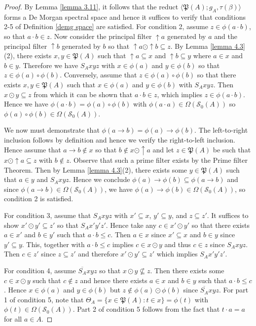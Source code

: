 \documentclass{amsart}
\theoremstyle{plain}
\theoremstyle{definition}
\begin{document}
\begin{proof}
By Lemma \ref{lemma 3.11}, it follows that the reduct $\langle\mathfrak{P}(A);g_A,\tau(\beta)\rangle$ forms a De Morgan spectral space and hence it suffices to verify that conditions 2-5 of Definition \ref{demg space} are satisfied. For condition 2, assume $z\in\phi(a\cdot b)$, so that $a\cdot b\in z$. Now consider the principal filter ${\uparrow}a$ generated by $a$ and the principal filter ${\uparrow}b$ generated by $b$ so that ${\uparrow}a\odot{\uparrow}b\subseteq z$. By Lemma \ref{lemma 4.3}(2), there exists $x,y\in\mathfrak{P}(A)$ such that ${\uparrow}a\subseteq x$ and ${\uparrow}b\subseteq y$ where $a\in x$ and $b\in y$. Therefore we have $S_Axyz$ with $x\in\phi(a)$ and $y\in\phi(b)$ so that $z\in\phi(a)\circ\phi(b)$. Conversely, assume that $z\in\phi(a)\circ\phi(b)$ so that there exists $x,y\in\mathfrak{P}(A)$ such that $x\in\phi(a)$ and $y\in\phi(b)$ with $S_Axyz$. Then $x\odot y\subseteq z$ from which it can be shown that $a\cdot b\in z$, which implies $z\in\phi(a\cdot b)$. Hence we have $\phi(a\cdot b)=\phi(a)\circ\phi(b)$ with $\phi(a\cdot a)\in\Omega(\mathcal{S}_0(A))$ so $\phi(a)\circ\phi(b)\in\Omega(\mathcal{S}_0(A))$.


We now must demonstrate that $\phi(a\rightarrow b)=\phi(a)\rightarrow\phi(b)$. The left-to-right inclusion follows by definition and hence we verify the right-to-left inclusion. Hence assume that $a\rightarrow b\not\in x$ so that $b\not\in x\odot{\uparrow}a$ and let $z\in\mathfrak{P}(A)$ be such that $x\odot{\uparrow}a\subseteq z$ with $b\not\in z$. Observe that such a prime filter exists by the Prime filter Theorem. Then by Lemma \ref{lemma 4.3}(2), there exists some $y\in\mathfrak{P}(A)$ such that $a\in y$ and $S_Axyz$. Hence we conclude $\phi(a)\rightarrow\phi(b)\subseteq\phi(a\rightarrow b)$ and since $\phi(a\rightarrow b)\in\Omega(\mathcal{S}_0(A))$, we have $\phi(a)\rightarrow\phi(b)\in\Omega(\mathcal{S}_0(A))$, so condition 2 is satisfied. 

    For condition 3, assume that $S_Axyz$ with $x'\subseteq x$, $y'\subseteq y$, and $z\subseteq z'$. It suffices to show $x'\odot y'\subseteq z'$ so that $S_Ax'y'z'$. Hence take any $c\in x'\odot y'$ so that there exists $a\in x'$ and $b\in y'$ such that $a\cdot b\leq c$. Then $a\in x$ since $x'\subseteq x$ and $b\in y$ since $y'\subseteq y$. This, together with $a\cdot b\leq c$ implies $c\in x\odot y$ and thus $c\in z$ since $S_Axyz$. Then $c\in z'$ since $z\subseteq z'$ and therefore $x'\odot y'\subseteq z'$ which implies $S_Ax'y'z'$.  

    For condition 4, assume $\overline{S_A}xyz$ so that $x\odot y\not\subseteq z$. Then there exists some $c\in x\odot y$ such that $c\not\in z$ and hence there exists $a\in x$ and $b\in y$ such that $a\cdot b\leq c$. Hence $x\in\phi(a)$ and $y\in\phi(b)$ but $z\not\in \phi(a)\odot\phi(b)$ since $\overline{S_A}xyz$. For part 1 of condition 5, note that $\Theta_A=\{x\in\mathfrak{P}(A):t\in x\}=\phi(t)$ with $\phi(t)\in\Omega(\mathcal{S}_0(A))$. Part 2 of condition 5 follows from the fact that $t\cdot a=a$ for all $a\in A$.    
\end{proof}
\end{document}
